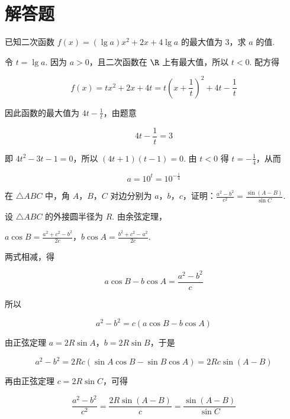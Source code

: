 \section{解答题}

\begin{problem}
已知二次函数 \(f(x)=(\lg a)x^2+2x+4\lg a\) 的最大值为 \(3\)，求 \(a\) 的值.
\end{problem}

\begin{solution}
令 \(t=\lg a\). 因为 \(a>0\)，且二次函数在 \(\R\) 上有最大值，所以 \(t<0\). 配方得

\[
f(x)=t x^2+2x+4t=t\left(x+\frac{1}{t}\right)^2+4t-\frac{1}{t}
\]

因此函数的最大值为 \(4t-\frac{1}{t}\)，由题意

\[
4t-\frac{1}{t}=3
\]

即 \(4t^2-3t-1=0\)，所以 \((4t+1)(t-1)=0\). 由 \(t<0\) 得 \(t=-\frac14\)，从而

\[
a=10^t=10^{-\frac14}
\]
\end{solution}

\begin{problem}
在 \(\triangle ABC\) 中，角 \(A\)，\(B\)，\(C\) 对边分别为 \(a\)，\(b\)，\(c\)，证明：\(\frac{a^2-b^2}{c^2}=\frac{\sin(A-B)}{\sin C}\).
\end{problem}

\begin{solution}
设 \(\triangle ABC\) 的外接圆半径为 \(R\). 由余弦定理，

\(a\cos B=\frac{a^2+c^2-b^2}{2c}\)，\(b\cos A=\frac{b^2+c^2-a^2}{2c}\).

两式相减，得

\[
a\cos B-b\cos A=\frac{a^2-b^2}{c}
\]

所以

\[
a^2-b^2=c\left(a\cos B-b\cos A\right)
\]

由正弦定理 \(a=2R\sin A\)，\(b=2R\sin B\)，于是

\[
a^2-b^2=2Rc\left(\sin A\cos B-\sin B\cos A\right)=2Rc\sin(A-B)
\]

再由正弦定理 \(c=2R\sin C\)，可得

\[
\frac{a^2-b^2}{c^2}=\frac{2R\sin(A-B)}{c}=\frac{\sin(A-B)}{\sin C}
\]
\end{solution}

